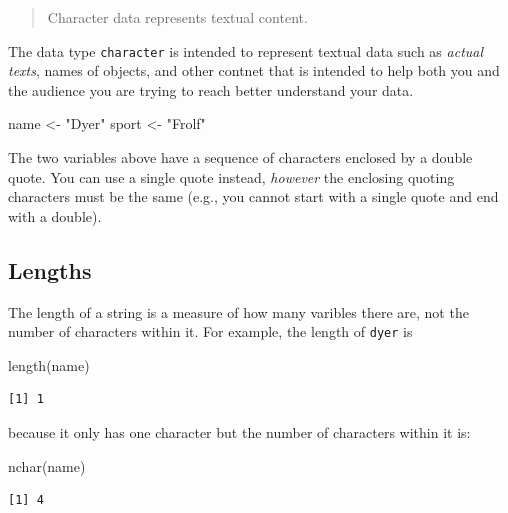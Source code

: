 \documentclass[
  letterpaper,
]{book}
\newenvironment{Shaded}{\begin{snugshade}}{\end{snugshade}}
\newcommand{\FunctionTok}[1]{\textcolor[rgb]{0.28,0.35,0.67}{#1}}
\newcommand{\NormalTok}[1]{\textcolor[rgb]{0.00,0.23,0.31}{#1}}
\newcommand{\OtherTok}[1]{\textcolor[rgb]{0.00,0.23,0.31}{#1}}
\newcommand{\StringTok}[1]{\textcolor[rgb]{0.13,0.47,0.30}{#1}}
\begin{document}
\begin{quote}
Character data represents textual content.
\end{quote}

The data type \texttt{character} is intended to represent textual data
such as \emph{actual texts}, names of objects, and other contnet that is
intended to help both you and the audience you are trying to reach
better understand your data.

\begin{Shaded}
\begin{Highlighting}[]
\NormalTok{name }\OtherTok{\textless{}{-}} \StringTok{"Dyer"}
\NormalTok{sport }\OtherTok{\textless{}{-}} \StringTok{"Frolf"}
\end{Highlighting}
\end{Shaded}

The two variables above have a sequence of characters enclosed by a
double quote. You can use a single quote instead, \emph{however} the
enclosing quoting characters must be the same (e.g., you cannot start
with a single quote and end with a double).

\subsection{Lengths}\label{lengths}

The length of a string is a measure of how many varibles there are, not
the number of characters within it. For example, the length of
\texttt{dyer} is

\begin{Shaded}
\begin{Highlighting}[]
\FunctionTok{length}\NormalTok{(name)}
\end{Highlighting}
\end{Shaded}

\begin{verbatim}
[1] 1
\end{verbatim}

because it only has one character but the number of characters within it
is:

\begin{Shaded}
\begin{Highlighting}[]
\FunctionTok{nchar}\NormalTok{(name)}
\end{Highlighting}
\end{Shaded}

\begin{verbatim}
[1] 4
\end{verbatim}
\end{document}
